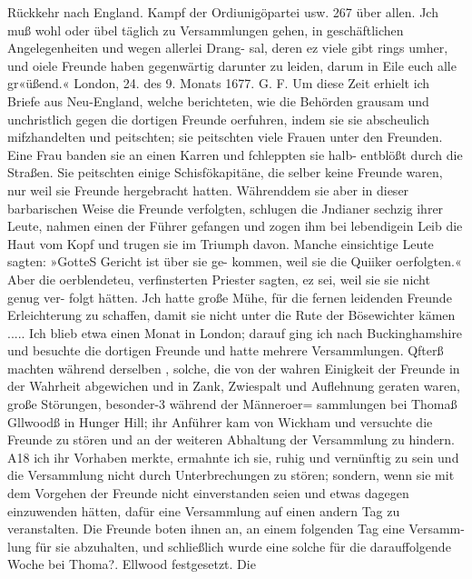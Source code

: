 Rückkehr nach England. Kampf der Ordiunigöpartei usw. 267
über allen. Jch muß wohl oder übel täglich zu Versammlungen
gehen, in geschäftlichen Angelegenheiten und wegen allerlei Drang-
sal, deren ez viele gibt rings umher, und oiele Freunde haben
gegenwärtig darunter zu leiden, darum in Eile euch alle gr«üßend.«
London, 24. des 9. Monats 1677. G. F.
Um diese Zeit erhielt ich Briefe aus Neu-England, welche
berichteten, wie die Behörden grausam und unchristlich gegen die
dortigen Freunde oerfuhren, indem sie sie abscheulich mifzhandelten
und peitschten; sie peitschten viele Frauen unter den Freunden.
Eine Frau banden sie an einen Karren und fchleppten sie halb-
entblößt durch die Straßen. Sie peitschten einige Schisfökapitäne,
die selber keine Freunde waren, nur weil sie Freunde hergebracht
hatten. Währenddem sie aber in dieser barbarischen Weise die
Freunde verfolgten, schlugen die Jndianer sechzig ihrer Leute,
nahmen einen der Führer gefangen und zogen ihm bei lebendigein
Leib die Haut vom Kopf und trugen sie im Triumph davon.
Manche einsichtige Leute sagten: »GotteS Gericht ist über sie ge-
kommen, weil sie die Quiiker oerfolgten.« Aber die oerblendeteu,
verfinsterten Priester sagten, ez sei, weil sie sie nicht genug ver-
folgt hätten. Jch hatte große Mühe, für die fernen leidenden
Freunde Erleichterung zu schaffen, damit sie nicht unter die Rute
der Bösewichter kämen .....
Ich blieb etwa einen Monat in London; darauf ging ich
nach Buckinghamshire und besuchte die dortigen Freunde und
hatte mehrere Versammlungen. Qfterß machten während derselben ,
solche, die von der wahren Einigkeit der Freunde in der Wahrheit
abgewichen und in Zank, Zwiespalt und Auflehnung geraten
waren, große Störungen, besonder-3 während der Männeroer=
sammlungen bei Thomaß Gllwoodß in Hunger Hill; ihr Anführer
kam von Wickham und versuchte die Freunde zu stören und
an der weiteren Abhaltung der Versammlung zu hindern. A18
ich ihr Vorhaben merkte, ermahnte ich sie, ruhig und vernünftig
zu sein und die Versammlung nicht durch Unterbrechungen zu
stören; sondern, wenn sie mit dem Vorgehen der Freunde nicht
einverstanden seien und etwas dagegen einzuwenden hätten, dafür
eine Versammlung auf einen andern Tag zu veranstalten. Die
Freunde boten ihnen an, an einem folgenden Tag eine Versamm-
lung für sie abzuhalten, und schließlich wurde eine solche für die
darauffolgende Woche bei Thoma?. Ellwood festgesetzt. Die


